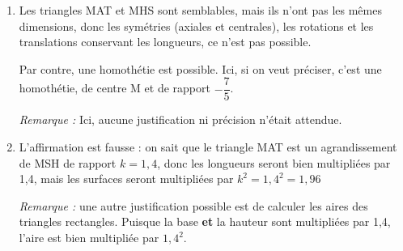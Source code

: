 \begin{enumerate}
\item Les triangles MAT et MHS sont semblables, mais ils n'ont pas les mêmes dimensions, donc les symétries (axiales et centrales), les rotations et les translations conservant les longueurs, ce n'est pas possible.

Par contre, une homothétie est possible. Ici, si on veut préciser, c'est une homothétie, de centre M et de rapport $ -\dfrac{7}{5} $.

\emph{Remarque :} Ici, aucune justification ni précision n'était attendue.

\item L'affirmation est fausse : on sait que le triangle MAT est un agrandissement de MSH de rapport $k =1,4$, donc les longueurs seront bien multipliées par 1,4, mais les surfaces seront multipliées par $k^2 = 1,4^2 = 1,96$

\emph{Remarque :} une autre justification possible est de calculer les aires des triangles rectangles. Puisque la base \textbf{et} la hauteur sont multipliées par 1,4, l'aire est bien multipliée par $1,4^2$.
\end{enumerate}

\bigskip


